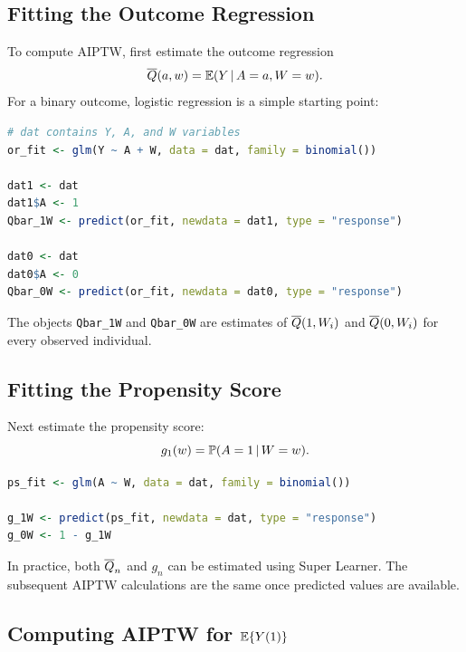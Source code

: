 \label{lec:7-4}

\subsection{Fitting the Outcome Regression}

To compute AIPTW, first estimate the outcome regression
\[
\overline{Q}(a,w)=\mathbb{E}(Y\,\vert\, A=a,W=w).
\]
For a binary outcome, logistic regression is a simple starting point:

\begin{implementationbox}
\begin{lstlisting}[language=R]
# dat contains Y, A, and W variables
or_fit <- glm(Y ~ A + W, data = dat, family = binomial())

dat1 <- dat
dat1$A <- 1
Qbar_1W <- predict(or_fit, newdata = dat1, type = "response")

dat0 <- dat
dat0$A <- 0
Qbar_0W <- predict(or_fit, newdata = dat0, type = "response")
\end{lstlisting}
\end{implementationbox}

The objects \texttt{Qbar\_1W} and \texttt{Qbar\_0W} are estimates of
$\overline{Q}(1,W_i)$ and $\overline{Q}(0,W_i)$ for every observed individual.

\subsection{Fitting the Propensity Score}

Next estimate the propensity score:
\[
g_1(w)=\mathbb{P}(A=1\,\vert\, W=w).
\]

\begin{implementationbox}
\begin{lstlisting}[language=R]
ps_fit <- glm(A ~ W, data = dat, family = binomial())

g_1W <- predict(ps_fit, newdata = dat, type = "response")
g_0W <- 1 - g_1W
\end{lstlisting}
\end{implementationbox}

In practice, both $\overline{Q}_n$ and $g_n$ can be estimated using Super Learner. The
subsequent AIPTW calculations are the same once predicted values are available.

\subsection{Computing AIPTW for $\mathbb{E}\{Y(1)\}$}

